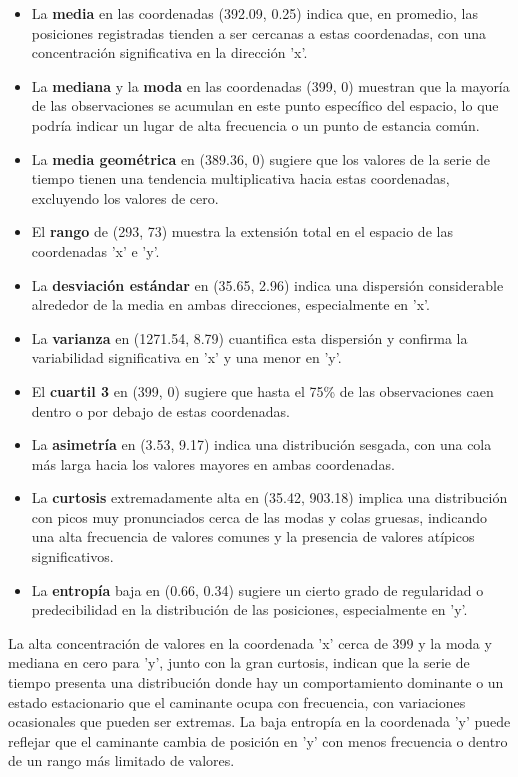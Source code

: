 \documentclass[11pt]{article} %
\begin{document}
	\begin{itemize}
		\item La \textbf{media} en las coordenadas (392.09, 0.25) indica que, en promedio, las posiciones registradas tienden a ser cercanas a estas coordenadas, con una concentración significativa en la dirección 'x'.
		\item La \textbf{mediana} y la \textbf{moda} en las coordenadas (399, 0) muestran que la mayoría de las observaciones se acumulan en este punto específico del espacio, lo que podría indicar un lugar de alta frecuencia o un punto de estancia común.
		\item La \textbf{media geométrica} en (389.36, 0) sugiere que los valores de la serie de tiempo tienen una tendencia multiplicativa hacia estas coordenadas, excluyendo los valores de cero.
		\item El \textbf{rango} de (293, 73) muestra la extensión total en el espacio de las coordenadas 'x' e 'y'.
		\item La \textbf{desviación estándar} en (35.65, 2.96) indica una dispersión considerable alrededor de la media en ambas direcciones, especialmente en 'x'.
		\item La \textbf{varianza} en (1271.54, 8.79) cuantifica esta dispersión y confirma la variabilidad significativa en 'x' y una menor en 'y'.
		\item El \textbf{cuartil 3} en (399, 0) sugiere que hasta el 75\% de las observaciones caen dentro o por debajo de estas coordenadas.
		\item La \textbf{asimetría} en (3.53, 9.17) indica una distribución sesgada, con una cola más larga hacia los valores mayores en ambas coordenadas.
		\item La \textbf{curtosis} extremadamente alta en (35.42, 903.18) implica una distribución con picos muy pronunciados cerca de las modas y colas gruesas, indicando una alta frecuencia de valores comunes y la presencia de valores atípicos significativos.
		\item La \textbf{entropía} baja en (0.66, 0.34) sugiere un cierto grado de regularidad o predecibilidad en la distribución de las posiciones, especialmente en 'y'.
	\end{itemize}
	
	La alta concentración de valores en la coordenada 'x' cerca de 399 y la moda y mediana en cero para 'y', junto con la gran curtosis, indican que la serie de tiempo presenta una distribución donde hay un comportamiento dominante o un estado estacionario que el caminante ocupa con frecuencia, con variaciones ocasionales que pueden ser extremas. La baja entropía en la coordenada 'y' puede reflejar que el caminante cambia de posición en 'y' con menos frecuencia o dentro de un rango más limitado de valores.
	
\end{document}

